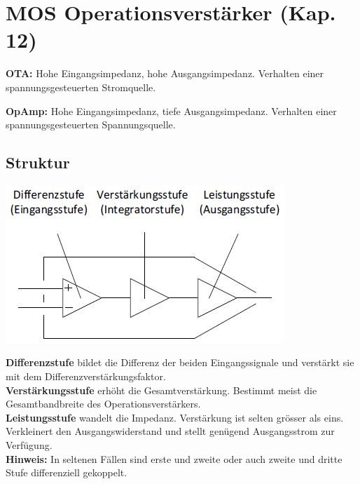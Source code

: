 \section{MOS Operationsverstärker (Kap. 12)}
\begin{minipage}[c]{0.5\textwidth}
	\textbf{OTA:} Hohe Eingangsimpedanz, hohe Ausgangsimpedanz. Verhalten einer spannungsgesteuerten Stromquelle.
\end{minipage}
\begin{minipage}[c]{0.5\textwidth}
	\textbf{OpAmp:} Hohe Eingangsimpedanz, tiefe Ausgangsimpedanz. Verhalten einer spannungsgesteuerten Spannungsquelle.
\end{minipage}

\subsection{Struktur}
\begin{minipage}[c]{0.3\textwidth}
	\includegraphics[width=1\linewidth]{chapters/OpAmp/images/Blockstruktur}
\end{minipage}
\begin{minipage}[c]{0.7\textwidth}
	\textbf{Differenzstufe} bildet die Differenz der beiden Eingangssignale und verstärkt sie mit dem Differenzverstärkungsfaktor.\\
	\textbf{Verstärkungsstufe} erhöht die Gesamtverstärkung. Bestimmt meist die Gesamtbandbreite des Operationsverstärkers.\\
	\textbf{Leistungsstufe} wandelt die Impedanz. Verstärkung ist selten grösser als eins. Verkleinert den Ausgangswiderstand und stellt genügend Ausgangsstrom zur Verfügung.\\[1ex]
	\textbf{Hinweis:} In seltenen Fällen sind erste und zweite oder auch zweite und dritte Stufe differenziell gekoppelt.
\end{minipage}

